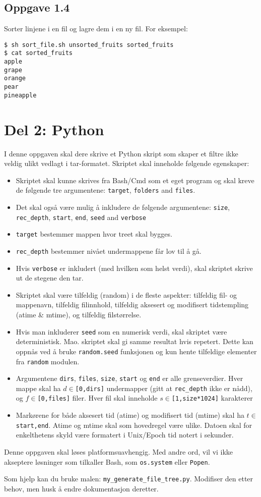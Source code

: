 \documentclass{article}
\begin{document}
\subsection*{Oppgave 1.4}
Sorter linjene i en fil og lagre dem i en ny fil.
For eksempel:
\begin{Verbatim}[fontsize=\small, frame=single]
$ sh sort_file.sh unsorted_fruits sorted_fruits
$ cat sorted_fruits
apple
grape
orange
pear
pineapple
\end{Verbatim}

\section*{Del 2: Python}

I denne oppgaven skal dere skrive et Python skript som skaper et
filtre ikke veldig ulikt vedlagt i tar-formatet.
Skriptet skal inneholde følgende egenskaper:
\begin{itemize}
    \item Skriptet skal kunne skrives fra Bash/Cmd som et eget
        program og skal kreve de følgende tre argumentene:
        \verb;target;, \verb;folders; and \verb;files;.
    \item Det skal også være mulig å inkludere de følgende
        argumentene:
        \verb;size;, \verb;rec_depth;, \verb;start;, \verb;end;,
        \verb;seed; and \verb;verbose;
    \item \verb;target; bestemmer mappen hvor treet skal bygges.
    \item \verb;rec_depth; bestemmer nivået undermappene får lov til
        å gå.
    \item Hvis \verb;verbose; er inkludert (med hvilken som helst
        verdi), skal skriptet skrive ut de stegene den tar.
    \item Skriptet skal være tilfeldig (random) i de fleste
        aspekter:
        tilfeldig fil- og mappenavn, tilfeldig filinnhold,
        tilfeldig aksesert og modifisert tidstempling (atime \&
        mtime), og tilfeldig filstørrelse.
    \item Hvis man inkluderer \verb;seed; som en numerisk verdi,
        skal skriptet være deterministisk.
        Mao. skriptet skal gi samme resultat hvis repetert.
        Dette kan oppnås ved å bruke \verb;random.seed; funksjonen
        og kun hente tilfeldige elementer fra \verb;random;
        modulen.
    \item Argumentene \verb;dirs;, \verb;files;, \verb;size;,
        \verb;start; og \verb;end; er alle grenseverdier.
        Hver mappe skal ha $d\in$\verb;[0,dirs]; undermapper
        (gitt at \verb;rec_depth; ikke er nådd), og
        $f\in$\verb;[0,files]; filer.
        Hver fil skal inneholde $s\in$\verb;[1,size*1024]; karakterer
    \item Markørene for både aksesert tid (atime) og modifisert tid
        (mtime) skal ha $t\in$\verb;start,end;.
        Atime og mtime skal som hovedregel være ulike.
        Datoen skal for enkelthetens skyld være formatert i
        Unix/Epoch tid notert i sekunder.
\end{itemize}

Denne oppgaven skal løses platformsuavhengig.
Med andre ord, vil vi ikke akseptere løsninger som tilkaller Bash,
som \verb;os.system; eller \verb;Popen;.

Som hjelp kan du bruke malen: \verb;my_generate_file_tree.py;.
Modifiser den etter behov, men husk å endre dokumentasjon deretter.
\end{document}

